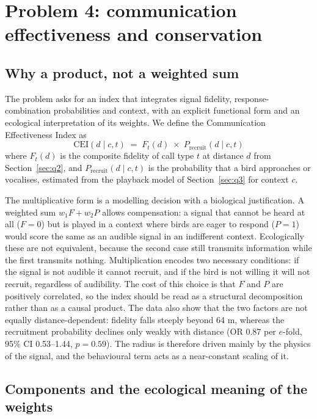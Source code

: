 \section{Problem 4: communication effectiveness and conservation}\label{sec:q4}

\subsection{Why a product, not a weighted sum}\label{sec:q4-form}

The problem asks for an index that integrates signal fidelity, response-combination
probabilities and context, with an explicit functional form and an ecological interpretation of
its weights. We define the Communication Effectiveness Index as
\begin{equation}\label{eq:cei}
  \boxed{\;\mathrm{CEI}(d \mid c, t) \;=\; F_t(d)\;\times\;P_{\mathrm{recruit}}(d \mid c, t)\;}
\end{equation}
where $F_t(d)$ is the composite fidelity of call type $t$ at distance $d$ from
Section~\ref{sec:q2}, and $P_{\mathrm{recruit}}(d\mid c,t)$ is the probability that a bird
approaches or vocalises, estimated from the playback model of Section~\ref{sec:q3} for context
$c$.

The multiplicative form is a modelling decision with a biological justification. A weighted sum
$w_1F+w_2P$ allows compensation: a signal that cannot be heard at all ($F=0$) but is played in a
context where birds are eager to respond ($P=1$) would score the same as an audible signal in an
indifferent context. Ecologically these are not equivalent, because the second case still
transmits information while the first transmits nothing. Multiplication encodes two necessary
conditions: if the signal is not audible it cannot recruit, and if the bird is not willing it
will not recruit, regardless of audibility. The cost of this choice is that $F$ and $P$ are
positively correlated, so the index should be read as a structural decomposition rather than as
a causal product. The data also show that the two factors are not equally distance-dependent:
fidelity falls steeply beyond 64 m, whereas the recruitment probability declines only weakly
with distance (OR 0.87 per $e$-fold, 95\% CI 0.53--1.44, $p=0.59$). The radius is therefore
driven mainly by the physics of the signal, and the behavioural term acts as a near-constant
scaling of it.

\subsection{Components and the ecological meaning of the weights}\label{sec:q4-weights}

